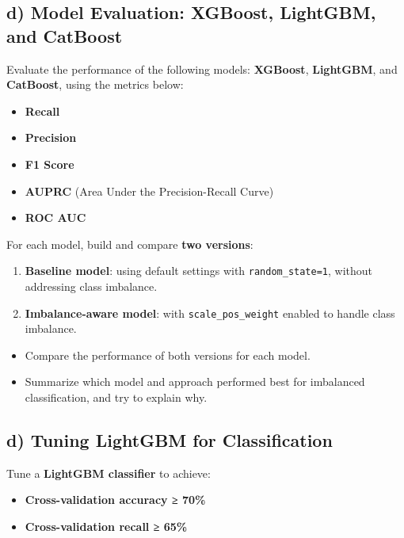 \documentclass[
  letterpaper,
  DIV=11,
  numbers=noendperiod]{scrreprt}
\providecommand{\tightlist}{%
  \setlength{\itemsep}{0pt}\setlength{\parskip}{0pt}}\usepackage{longtable,booktabs,array}
\begin{document}
\subsection{d) Model Evaluation: XGBoost, LightGBM, and
CatBoost}\label{d-model-evaluation-xgboost-lightgbm-and-catboost}

Evaluate the performance of the following models: \textbf{XGBoost},
\textbf{LightGBM}, and \textbf{CatBoost}, using the metrics below:

\begin{itemize}
\tightlist
\item
  \textbf{Recall}
\item
  \textbf{Precision}
\item
  \textbf{F1 Score}
\item
  \textbf{AUPRC} (Area Under the Precision-Recall Curve)
\item
  \textbf{ROC AUC}
\end{itemize}

For each model, build and compare \textbf{two versions}:

\begin{enumerate}
\def\labelenumi{\arabic{enumi}.}
\tightlist
\item
  \textbf{Baseline model}: using default settings with
  \texttt{random\_state=1}, without addressing class imbalance.
\item
  \textbf{Imbalance-aware model}: with \texttt{scale\_pos\_weight}
  enabled to handle class imbalance.
\end{enumerate}

\begin{itemize}
\tightlist
\item
  Compare the performance of both versions for each model.
\item
  Summarize which model and approach performed best for imbalanced
  classification, and try to explain why.
\end{itemize}

\subsection{d) Tuning LightGBM for
Classification}\label{d-tuning-lightgbm-for-classification}

Tune a \textbf{LightGBM classifier} to achieve:

\begin{itemize}
\tightlist
\item
  \textbf{Cross-validation accuracy ≥ 70\%}
\item
  \textbf{Cross-validation recall ≥ 65\%}
\end{itemize}
\end{document}
